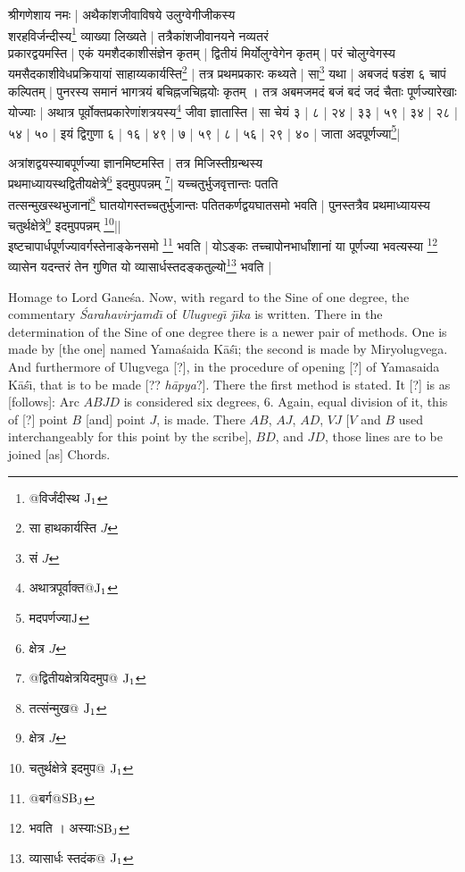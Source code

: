 \documentclass[11pt,a5paper]{book}
\def\Ganesa{Ga\-\*ne\-\'sa}
\begin{document}
{\s  
श्रीगणेशाय नमः | 
अथैकांशजीवाविषये
उलुग्वेगीजीकस्य \\
शरहविर्जन्दीस्य\footnote{{\s @विर्जंदीस्थ }${\rm J_1}$}
व्याख्या लिख्यते |
तत्रैकांशजी\-वान\-यने नव्यतरं \\प्रकारद्वयमस्ति |
एकं यमशैदकाशीसंज्ञेन कृतम् |
द्वितीयं मिर्योलुग्वेगेन कृतम् |
परं चोलुग्वेगस्य यमसैदकाशीवेधप्रक्रियायां
साहाय्यकार्यस्ति\footnote{{\s सा हाथकार्यस्ति} $J$} |
तत्र प्रथमप्रकारः कथ्यते | सा\footnote{{\s सं} $J$} यथा |
अबजदं षडंश ६ चापं कल्पितम् |
पुनरस्य समानं भागत्रयं बचिह्नजचिह्नयोः कृतम् ।
तत्र अबमजमदं बजं बदं जदं चैताः पूर्णज्यारेखाः
योज्याः |
अथात्र पूर्वोक्तप्रकारेणांशत्रयस्य\footnote{{\s अथात्रपूर्वाक्त@}${\rm J_1}$}
जीवा ज्ञातास्ति | सा चेयं ३ | ८ | २४ | ३३ | ५९ | ३४ | २८ | ५४ | ५० |
इयं द्विगुणा ६ | १६ | ४९ | ७ | ५९ | ८ | ५६ | २९ | ४० | जाता अदपूर्णज्या\footnote{{\s मदपर्णज्या}${\rm J}$}|

अत्रांशद्वयस्याबपूर्णज्या ज्ञानमिष्टमस्ति |
तत्र मिजिस्तीग्रन्थस्य \\
प्रथमाध्यायस्थद्वितीयक्षेत्रे\footnote{{\s क्षेत्र} $J$} 
इदमुपपन्नम् \footnote{{\s @द्वितीयक्षेत्रयिदमुप@ }${\rm J_1}$}|
यच्चतुर्भुजवृत्तान्तः पतति \\
तत्सन्मुखस्थभुजानां\footnote{{\s तत्संन्मुख@ } ${\rm J_1}$}
घातयोगस्तच्चतुर्भुजान्तः पतितकर्णद्वयघातसमो भवति |
पुनस्तत्रैव प्रथमाध्यायस्य
चतुर्थक्षेत्रे\footnote{{\s क्षेत्र} $J$} इदमुपपन्नम् \footnote{{\s चतुर्थक्षेत्रे इदमुप@ }${\rm J_1}$}|| \\
इष्टचापार्धपूर्णज्यावर्गस्तेनाङ्केनसमो \footnote{{\s @बर्ग@}${\rm SB_J}$} भवति |
योऽङ्कः %
 तच्चापोनभार्धांशानां या पूर्णज्या भवत्यस्या \footnote{{\s भवति । अस्याः}${\rm SB_J}$}
व्यासेन यदन्तरं तेन गुणित यो
व्यासार्धस्तदङ्कतुल्यो\footnote{{\s व्यासार्धः स्तदंक@ }${\rm J_1}$}
भवति |}


\newpage

Homage to Lord \Ganesa.  Now, with regard to the Sine of one degree, the commentary
\textit{\'Sarahavirja\*md\={\i}} of \textit{Ulugveg\={\i} j\={\i}ka} is written.
There  in the determination of the Sine of one degree there is a newer pair of methods. 
One is made by [the one] named Yama\'saida K\=a\'s\={\i}; the second is made by
Miryolugvega. And furthermore of Ulugvega [?], in the procedure of opening [?]
of Yamasaida K\=a\'s\={\i}, that is to be made [?? \textit{h\=apya}?].
There the first method is stated. It [?] is as [follows]: Arc $ABJD$ is considered six degrees, 6. Again, equal division of it, this of [?]
point $B$ [and] point $J$, is made. There $AB$, $AJ$, $AD$, $VJ$ [$V$ and $B$ used
interchangeably for this point by the scribe], $BD$, and $JD$,
those lines are to be joined [as] Chords. 
\end{document}
